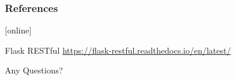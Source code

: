 \documentclass{beamer}
\begin{document}
\begin{frame}[allowframebreaks]
  \frametitle<presentation>{References}
    
  \begin{thebibliography}{10}
    
  [online]
  
  Flask RESTful
  \newblock \url{https://flask-restful.readthedocs.io/en/latest/}
  \end{thebibliography}
\end{frame}

\begin{frame}
\Huge
\center
Any Questions?
\end{frame}
\end{document}
